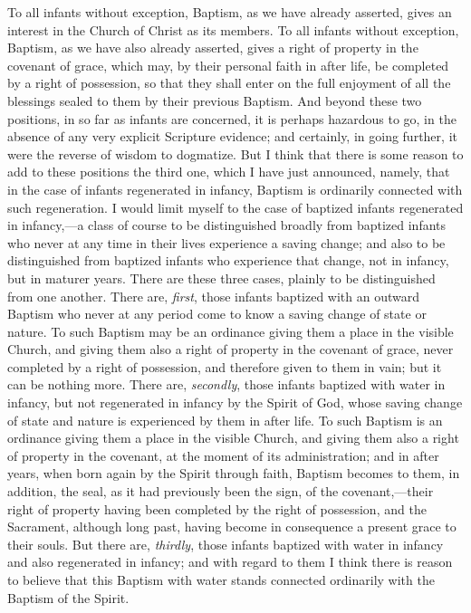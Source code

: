 \documentclass[
  english,
]{book}
\begin{document}
To all infants without exception, Baptism, as we have already asserted, gives an interest in the Church of Christ as its members. To all infants without exception, Baptism, as we have also already asserted, gives a right of property in the covenant of grace, which may, by their personal faith in after life, be completed by a right of possession, so that they shall enter on the full enjoyment of all the blessings sealed to them by their previous Baptism. And beyond these two positions, in so far as infants are concerned, it is perhaps hazardous to go, in the absence of any very explicit Scripture evidence; and certainly, in going further, it were the reverse of wisdom to dogmatize. But I think that there is some reason to add to these positions the third one, which I have just announced, namely, that in the case of infants regenerated in infancy, Baptism is ordinarily connected with such regeneration. I would limit myself to the case of baptized infants regenerated in infancy,---a class of course to be distinguished broadly from baptized infants who never at any time in their lives experience a saving change; and also to be distinguished from baptized infants who experience that change, not in infancy, but in maturer years. There are these three cases, plainly to be distinguished from one another. There are, \emph{first}, those infants baptized with an outward Baptism who never at any period come to know a saving change of state or nature. To such Baptism may be an ordinance giving them a place in the visible Church, and giving them also a right of property in the covenant of grace, never completed by a right of possession, and therefore given to them in vain; but it can be nothing more. There are, \emph{secondly}, those infants baptized with water in infancy, but not regenerated in infancy by the Spirit of God, whose saving change of state and nature is experienced by them in after life. To such Baptism is an ordinance giving them a place in the visible Church, and giving them also a right of property in the covenant, at the moment of its administration; and in after years, when born again by the Spirit through faith, Baptism becomes to them, in addition, the seal, as it had previously been the sign, of the covenant,---their right of property having been completed by the right of possession, and the Sacrament, although long past, having become in consequence a present grace to their souls. But there are, \emph{thirdly}, those infants baptized with water in infancy and also regenerated in infancy; and with regard to them I think there is reason to believe that this Baptism with water stands connected ordinarily with the Baptism of the Spirit.
\end{document}
